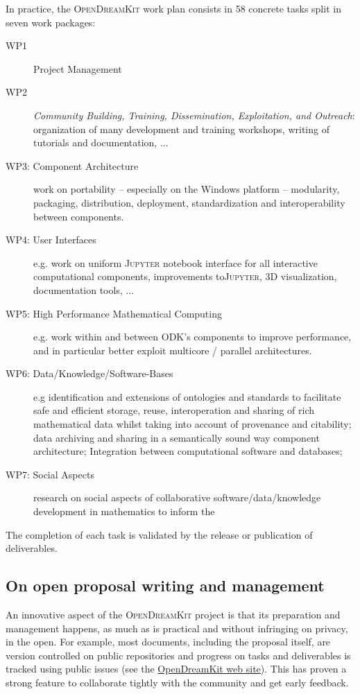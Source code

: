 \documentclass{llncs}
\newcommand{\software}[1]{\textsc{#1}\xspace}
\newcommand{\Jupyter}{\software{Jupyter}}
\newcommand{\ODK}{\software{OpenDreamKit}}
\begin{document}

In practice, the \ODK work plan consists in 58 concrete tasks split in
seven work packages:
\begin{description}
\item[WP1] Project Management
\item[WP2] \emph{Community Building, Training, Dissemination,
    Exploitation, and Outreach}: organization of many development and
  training workshops, writing of tutorials and documentation, ...
\item[WP3: Component Architecture] work on portability -- especially
  on the Windows platform -- modularity, packaging, distribution,
  deployment, standardization and interoperability between components.
\item[WP4: User Interfaces] e.g. work on uniform \Jupyter notebook
  interface for all interactive computational components, improvements
  to\Jupyter, 3D visualization, documentation tools, ...
\item[WP5: High Performance Mathematical Computing] e.g. work within
  and between ODK's components to improve performance, and in
  particular better exploit multicore / parallel architectures.
\item[WP6: Data/Knowledge/Software-Bases] e.g identification and
  extensions of ontologies and standards to facilitate safe and
  efficient storage, reuse, interoperation and sharing of rich
  mathematical data whilst taking into account of provenance and
  citability; data archiving and sharing in a semantically sound way
  component architecture; Integration between computational software and databases;
\item[WP7: Social Aspects] research on social aspects of collaborative
  software/data/knowledge development in mathematics to inform the 
\end{description}
The completion of each task is validated by the release or publication
of deliverables.


\subsection{On open proposal writing and management}

An innovative aspect of the \ODK project is that its preparation and
management happens, as much as is practical and without infringing on
privacy, in the open. For example, most documents, including the
proposal itself, are version controlled on public repositories and
progress on tasks and deliverables is tracked using public issues (see
the \href{http://opendreamkit.org/}{OpenDreamKit web site}). This has
proven a strong feature to collaborate tightly with the community and
get early feedback.
\end{document}
